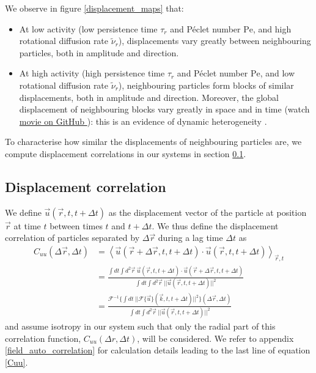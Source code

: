\documentclass[class=report, float=false, crop=false]{standalone}
\begin{document}
We observe in figure \ref{displacement_maps} that:
\begin{itemize}
  \item At low activity (low persistence time $\tau_r$ and P\'eclet number $\text{Pe}$, and high rotational diffusion rate $\tilde{\nu}_r$), displacements vary greatly between neighbouring particles, both in amplitude and direction.
  \item At high activity (high persistence time $\tau_r$ and P\'eclet number $\text{Pe}$, and low rotational diffusion rate $\tilde{\nu}_r$), neighbouring particles form blocks of similar displacements, both in amplitude and direction. Moreover, the global displacement of neighbouring blocks vary greatly in space and in time (watch \href{https://github.com/yketa/UBC_2018_Wiki/blob/master/presentation_7_30_18/movies/u_Dk8000_Vj1000_Rg2000_Nq1000_Io5000_Tm5000_Bn1000_Pl5000_Mm5000/u_Dk8000_Vj1000_Rg2000_Nq1000_Io5000_Tm5000_Bn1000_Pl5000_Mm5000.mov?raw=true}{movie on GitHub \faGithub}): this is an evidence of dynamic heterogeneity \cite{berthier2011dynamic}.
\end{itemize}
To characterise how similar the displacements of neighbouring particles are, we compute displacement correlations in our systems in section \ref{displacement_correlation}.

\subsection{Displacement correlation}
\label{displacement_correlation}


We define $\vec{u}(\vec{r}, t, t + \Delta t)$ as the displacement vector of the particle at position $\vec{r}$ at time $t$ between times $t$ and $t + \Delta t$. We thus define the displacement correlation of particles separated by $\Delta \vec{r}$ during a lag time $\Delta t$ as
\begin{equation}
\begin{aligned}
C_{uu}(\Delta \vec{r}, \Delta t) &= \left<\vec{u}(\vec{r}+\Delta\vec{r}, t, t + \Delta t)\cdot\vec{u}(\vec{r}, t, t + \Delta t)\right>_{\vec{r}, t}
\\
&= \frac{\int dt \int d^2\vec{r}~ \vec{u}(\vec{r}, t, t+\Delta t)\cdot\vec{u}(\vec{r} + \Delta \vec{r}, t, t+\Delta t)}{\int dt \int d^2\vec{r}~ ||\vec{u}(\vec{r}, t, t+\Delta t)||^2}
\\
&= \frac{\mathcal{F}^{-1}\{\int dt~ ||\mathcal{F}\{\vec{u}\}(\vec{k}, t, t + \Delta t)||^2\}(\Delta \vec{r}, \Delta t)}{\int dt \int d^2\vec{r}~ ||\vec{u}(\vec{r}, t, t+\Delta t)||^2}
\end{aligned}
\label{Cuu}
\end{equation}
and assume isotropy in our system such that only the radial part of this correlation function, $C_{uu}(\Delta r, \Delta t)$, will be considered. We refer to appendix \ref{field_auto_correlation} for calculation details leading to the last line of equation \ref{Cuu}.\\
\end{document}
